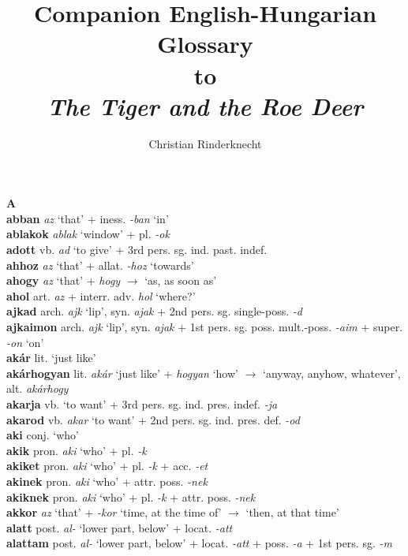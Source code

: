 \documentclass[11pt]{article}
\title{Companion English-Hungarian Glossary\\
to \\
\emph{The Tiger and the Roe Deer}}
\author{Christian Rinderknecht\\}
\date{\oldstylenums{2026}}
\begin{document}
\maketitle

\noindent \textbf{\large A} \\
\textbf{abban} \emph{az} `that' + iness. \emph{-ban} `in' \\
\textbf{ablakok} \emph{ablak} `window' + pl. \emph{-ok} \\
\textbf{adott} vb. \emph{ad} `to give' + 3rd pers. sg. ind. past. indef. \\
\textbf{ahhoz} \emph{az} `that' + allat. \emph{-hoz} `towards' \\
\textbf{ahogy} \emph{az} `that' + \emph{hogy} $\rightarrow$ `as, as
soon as' \\
\textbf{ahol} art. \emph{az} + interr. adv. \emph{hol} `where?' \\
\textbf{ajkad} arch. \emph{ajk} `lip', syn. \emph{ajak} + 2nd
pers. sg. single\hyp{}poss. \emph{-d} \\
\textbf{ajkaimon} arch. \emph{ajk} `lip', syn. \emph{ajak} +  1st
pers. sg. poss. mult.\hyp{}poss. \emph{-aim} + super. \emph{-on} `on' \\
\textbf{akár} lit. `just like' \\
\textbf{akárhogyan} lit. \emph{akár} `just like' + \emph{hogyan} `how'
$\rightarrow$ `anyway, anyhow, whatever', alt. \emph{akárhogy} \\
\textbf{akarja} vb. `to want' + 3rd
pers. sg. ind. pres. indef. \emph{-ja} \\
\textbf{akarod} vb. \emph{akar} `to want' + 2nd
pers. sg. ind. pres. def. \emph{-od} \\
\textbf{aki} conj. `who' \\
\textbf{akik} pron. \emph{aki} `who' + pl. \emph{-k} \\
\textbf{akiket} pron. \emph{aki} `who' + pl. \emph{-k} +
acc. \emph{-et} \\
\textbf{akinek} pron. \emph{aki} `who' + attr. poss. \emph{-nek} \\
\textbf{akiknek} pron. \emph{aki} `who' + pl. \emph{-k} +
attr. poss. \emph{-nek} \\
\textbf{akkor} \emph{az} `that' + \emph{-kor} `time, at the time of'
$\rightarrow$ `then, at that time' \\
\textbf{alatt} post. \emph{al-} `lower part, below' +
locat. \emph{-att} \\
\textbf{alattam} post. \emph{al-} `lower part, below' +
locat. \emph{-att} + poss. \emph{-a} + 1st pers. sg. \emph{-m}
\end{document}
